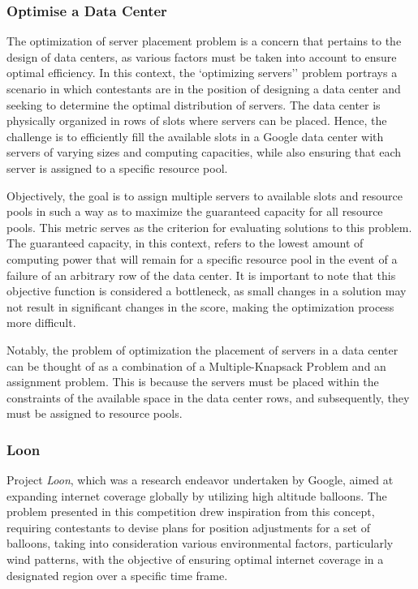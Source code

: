 \subsubsection*{Optimise a Data Center}
\label{subsubsec:hashcode-2015-qualification}

The optimization of server placement problem is a concern that pertains to the
design of data centers, as various factors must be taken into account to ensure
optimal efficiency. In this context, the `optimizing servers'' problem portrays
a scenario in which contestants are in the position of designing a data center
and seeking to determine the optimal distribution of servers. The data center
is physically organized in rows of slots where servers can be placed. Hence,
the challenge is to efficiently fill the available slots in a Google data center
with servers of varying sizes and computing capacities, while also ensuring that
each server is assigned to a specific resource pool.

Objectively, the goal is to assign multiple servers to available slots and
resource pools in such a way as to maximize the guaranteed capacity for all
resource pools. This metric serves as the criterion for evaluating solutions to
this problem. The guaranteed capacity, in this context, refers to the lowest
amount of computing power that will remain for a specific resource pool in the
event of a failure of an arbitrary row of the data center. It is important to
note that this objective function is considered a bottleneck, as small changes
in a solution may not result in significant changes in the score, making the
optimization process more difficult.

Notably, the problem of optimization the placement of servers in a data center can
be thought of as a combination of a Multiple-Knapsack Problem and an assignment
problem. This is because the servers must be placed within the constraints of
the available space in the data center rows, and subsequently, they must be
assigned to resource pools.

\subsubsection*{Loon}
\label{subsubsec:hashcode-2015-final}

Project \textit{Loon}, which was a research endeavor undertaken by Google, aimed at
expanding internet coverage globally by utilizing high altitude balloons. The
problem presented in this competition drew inspiration from this concept,
requiring contestants to devise plans for position adjustments for a set of
balloons, taking into consideration various environmental factors, particularly
wind patterns, with the objective of ensuring optimal internet coverage in a
designated region over a specific time frame.


